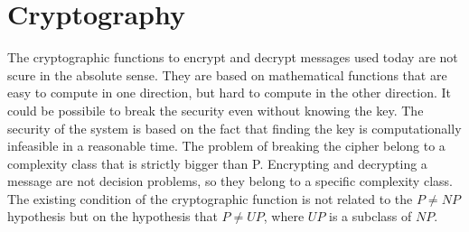 \section{Cryptography}
The cryptographic functions to encrypt and decrypt messages used today are not scure in the absolute sense. They are based on mathematical functions that are easy to compute in one direction, but hard to compute in the other direction. It could be possibile to break the security even without knowing the key. The security of the system is based on the fact that finding the key is computationally infeasible in a reasonable time. The problem of breaking the cipher belong to a complexity class that is strictly bigger than P. Encrypting and decrypting a message are not decision problems, so they belong to a specific complexity class. The existing condition of the cryptographic function is not related to the $P\not= NP$ hypothesis but on the hypothesis that $P\not= UP$, where $UP$ is a subclass of $NP$.